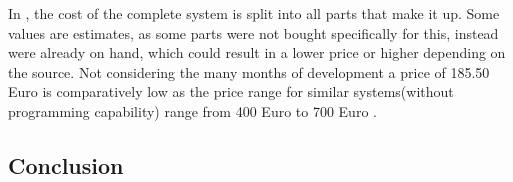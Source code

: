 \noindent In , the cost of the complete system is split into all parts that make it up. Some values are estimates, as some parts were not bought specifically for this, instead were already on hand, which could result in a lower price or higher depending on the source. Not considering the many months of development a price of 185.50 Euro is comparatively low as the price range for similar systems(without programming capability) range from 400 Euro  to 700 Euro . \\

\subsection{Conclusion}


\pagebreak
